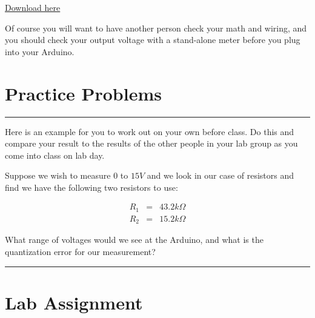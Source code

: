 \href{https://raw.githubusercontent.com/rtlines/IntermediateLabPH250/main/Code/DAQ_Extended_voltmeter.ino}{Download here}



\bigskip Of course you will want to have another person check your math and
wiring, and you should check your output voltage with a stand-alone meter
before you plug into your Arduino.

\section{Practice Problems}

\rule{11cm}{0.03cm}

Here is an example for you to work out on your own before class. Do this and compare your result to the results of the other people in your lab group as you come into class on lab day.

Suppose we wish to measure $0$ to $15\unit{V}$ and we look in our case of resistors and find we have the following two resistors to use:

\begin{eqnarray*}
	R_{1} &=&43.2\unit{k\Omega} \\
	R_{2} &=&15.2\unit{k\Omega}
\end{eqnarray*}

What range of voltages would we see at the Arduino, and what is the quantization error for our measurement?

\rule{11cm}{0.03cm}


%


\vspace*{\fill}

\pagebreak

\section{Lab Assignment}

